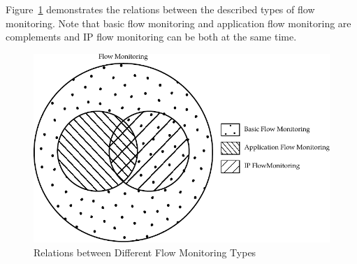 Figure~\ref{fig:flow-monitoring-types} demonstrates the relations between the described types of flow monitoring. Note that basic flow monitoring and application flow monitoring are complements and IP flow monitoring can be both at the same time.

\begin{figure}[t!]
  \begin{center}
    \includegraphics[width=\textwidth]{figures/flow-monitoring-types}
  \end{center}
  \caption{Relations between Different Flow Monitoring Types}
  \label{fig:flow-monitoring-types}
\end{figure}


